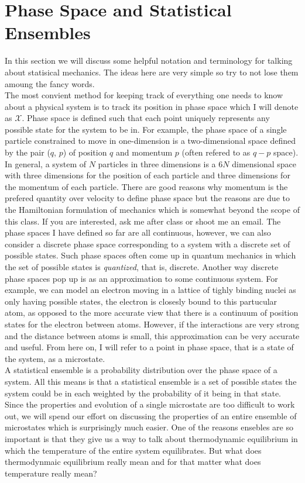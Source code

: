\documentclass[11pt,a4paper]{article}
\theoremstyle{theorem}
\theoremstyle{definition}
\theoremstyle{definition}
\theoremstyle{remark}
\theoremstyle{definition}
\theoremstyle{remark}
\newcommand{\phase}{\mathscr{X}}
\begin{document}
\section{Phase Space and Statistical Ensembles}     
In this section we will discuss some helpful notation and terminology for talking about statisical mechanics. The ideas here are very simple so try to not lose them amoung the fancy words. \bigskip \\
The most convient method for keeping track of everything one needs to know about a physical system is to track its position in phase space which I will denote as $\phase$. Phase space is defined such that each point uniquely represents any possible state for the system to be in. For example, the phase space of a single particle constrained to move in one-dimension is a two-dimensional space defined by the pair ($q$, $p$) of position $q$ and momentum $p$ (often refered to as $q-p$ space). In general, a system of $N$ particles in three dimensions is a $6 N$ dimensional space with three dimensions for the position of each particle and three dimensions for the momentum of each particle. There are good reasons why momentum is the prefered quantity over velocity to define phase space but the reasons are due to the Hamiltonian formulation of mechanics which is somewhat beyond the scope of this class. If you are interested, ask me after class or shoot me an email. The phase spaces I have defined so far are all continuous, however, we can also consider a discrete phase space corresponding to a system with a discrete set of possible states. Such phase spaces often come up in quantum mechanics in which the set of possible states is \textit{quantized}, that is, discrete. Another way discrete phase spaces pop up is as an approximation to some continuous system. For example, we can model an electron moving in a lattice of tighly binding nuclei as only having possible states, the electron is closesly bound to this partucular atom, as opposed to the more accurate view that there is a continuum of position states for the electron between atoms. However, if the interactions are very strong and the distance between atoms is small, this approximation can be very accurate and useful. From here on, I will refer to a point in phase space, that is a state of the system, as a microstate. \bigskip\\
A statistical ensemble is a probability distribution over the phase space of a system. All this means is that a statistical ensemble is a set of possible states the system could be in each weighted by the probability of it being in that state. Since the properties and evolution of a single microstate are too difficult to work out, we will spend our effort on discussing the properties of an entire ensemble of microstates which is surprisingly much easier. One of the reasons ensebles are so important is that they give us a way to talk about thermodynamic equilibrium in which the temperature of the entire system equilibrates. But what does thermodynmaic equilibrium really mean and for that matter what does temperature really mean?
\end{document}

